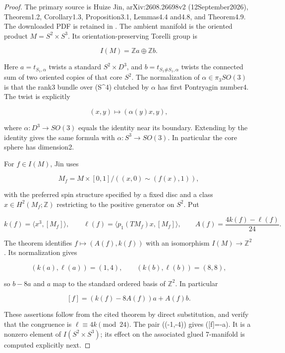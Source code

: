 \begin{proof}
The primary source is Huize Jin, arXiv:2608.26698v2 (12September2026), Theorem1.2, Corollary1.3, Proposition3.1, Lemmas4.4 and4.8, and Theorem4.9. The downloaded PDF is retained in . The ambient manifold is the oriented product \(M=S^2\times S^3\). Its orientation-preserving Torelli group is

\[
 I(M)=\mathbb Za\oplus\mathbb Zb.
\]

Here \(a=t_{S_1,\alpha}\) twists a standard \(S^2\times D^3\), and \(b=t_{S_1\#S_1,\alpha}\) twists the connected sum of two oriented copies of that core \(S^2\). The normalization of \(\alpha\in\pi_3SO(3)\) is that the rank3 bundle over (S\^{}4) clutched by \(\alpha\) has first Pontryagin number4. The twist is explicitly

\[
 (x,y)\longmapsto(\alpha(y)x,y),
\]

where \(\alpha:D^3\to SO(3)\) equals the identity near its boundary. Extending by the identity gives the same formula with \(\alpha:S^3\to SO(3)\). In particular the core sphere has dimension2.

For \(f\in I(M)\), Jin uses

\[
 M_f=M\times[0,1]/((x,0)\sim(f(x),1)),
\]

with the preferred spin structure specified by a fixed disc and a class \(x\in H^2(M_f;\mathbb Z)\) restricting to the positive generator on \(S^2\). Put

\[
 k(f)=\langle x^3,[M_f]\rangle,\qquad
 \ell(f)=\langle p_1(TM_f)x,[M_f]\rangle,
 \qquad A(f)=\frac{4k(f)-\ell(f)}{24}.
\]

The theorem identifies \(f\mapsto(A(f),k(f))\) with an isomorphism \(I(M)\to\mathbb Z^2\). Its normalization gives

\[
 (k(a),\ell(a))=(1,4),\qquad
 (k(b),\ell(b))=(8,8),
\]

so \(b-8a\) and \(a\) map to the standard ordered basis of \(\mathbb Z^2\). In particular

\[
 [f]=(k(f)-8A(f))a+A(f)b. \tag{P3F.3.1}
\]

These assertions follow from the cited theorem by direct substitution, and verify that the congruence is \(\ell\equiv4k\pmod{24}\). The pair ((-1,-4)) gives ({[}f{]}=-a). It is a nonzero element of \(I(S^2\times S^3)\); its effect on the associated glued 7-manifold is computed explicitly next.
\end{proof}
